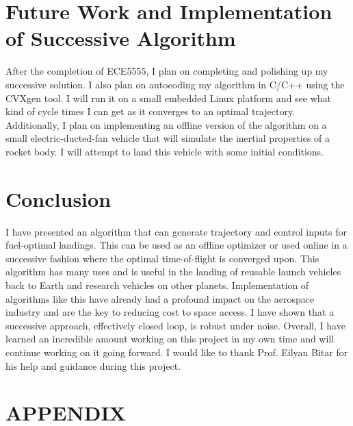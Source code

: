 \documentclass[journal]{new-aiaa}
\begin{document}
\begin{singlespace}
\section{Future Work and Implementation of Successive Algorithm}
After the completion of ECE5555, I plan on completing and polishing up my successive solution. I also plan on autocoding my algorithm in C/C++ using the CVXgen tool. I will run it on a small embedded Linux platform and see what kind of cycle times I can get as it converges to an optimal trajectory. Additionally, I plan on implementing an offline version of the algorithm on a small electric-ducted-fan vehicle that will simulate the inertial properties of a rocket body. I will attempt to land this vehicle with some initial conditions.



\section{Conclusion}
I have presented an algorithm that can generate trajectory and control inputs for fuel-optimal landings. This can be used as an offline optimizer or used online in a successive fashion where the optimal time-of-flight is converged upon. This algorithm has many uses and is useful in the landing of reusable launch vehicles back to Earth and research vehicles on other planets. Implementation of algorithms like this have already had a profound impact on the aerospace industry and are the key to reducing cost to space access. I have shown that a successive approach, effectively closed loop, is robust under noise. Overall, I have learned an incredible amount working on this project in my own time and will continue working on it going forward. I would like to thank Prof. Eilyan Bitar for his help and guidance during this project.

\appendix
\section{APPENDIX}

\end{singlespace}
\end{document}

